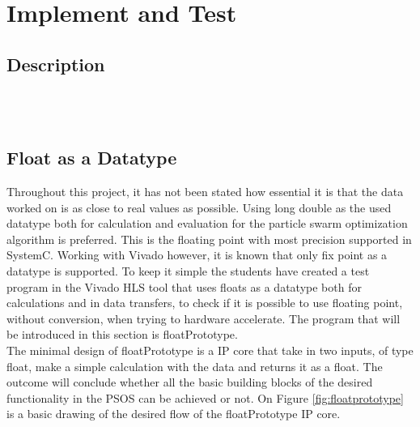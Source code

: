 \section{Implement and Test}

\subsection{Description}

\noindent{}
\\\\

\subsection{Float as a Datatype}\label{imp:floatprototype}
Throughout this project, it has not been stated how essential it is that the data worked on is as close to real values as possible. Using long double as the used datatype both for calculation and evaluation for the particle swarm optimization algorithm is preferred. This is the floating point with most precision supported in SystemC. Working with Vivado  however, it is known that only fix point as a datatype is supported. To keep it simple the students have created a test program in the Vivado HLS tool that uses floats as a datatype both for calculations and in data transfers, to check if it is possible to use floating point, without conversion, when trying to hardware accelerate. The program that will be introduced in this section is floatPrototype.\\

The minimal design of floatPrototype is a IP core that take in two inputs, of type float, make a simple calculation with the data and returns it as a float. The outcome will conclude whether all the basic building blocks of the desired functionality in the PSOS can be achieved or not. On Figure \ref{fig:floatprototype} is a basic drawing of the desired flow of the floatPrototype IP core.

